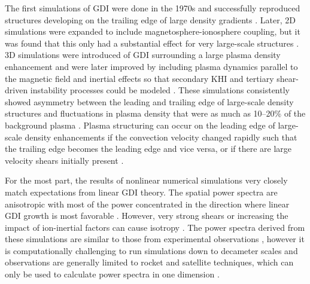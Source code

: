 The first simulations of GDI were done in the 1970s and successfully reproduced structures developing on the trailing edge of large density gradients \citep{Zabusky1973,Doles1976,Scannapieco1976,Ossakow1975,Ossakow1977}.  Later, 2D simulations were expanded to include magnetosphere-ionosphere coupling, but it was found that this only had a substantial effect for very large-scale structures \citep{Keskinen1990}.  3D simulations were introduced of GDI surrounding a large plasma density enhancement \citep{Guzdar1998} and were later improved by including plasma dynamics parallel to the magnetic field and inertial effects so that secondary KHI and tertiary shear-driven instability processes could be modeled \citep{Gondarenko1999}.  These simulations consistently showed asymmetry between the leading and trailing edge of large-scale density structures and fluctuations in plasma density that were as much as 10--20\% of the background plasma \citep{Gondarenko2004a,Gondarenko2004b}.  Plasma structuring can occur on the leading edge of large-scale density enhancements if the convection velocity changed rapidly such that the trailing edge becomes the leading edge and vice versa, or if there are large velocity shears initially present \citep{Gondarenko2004a,Gondarenko2004b}.

For the most part, the results of nonlinear numerical simulations very closely match expectations from linear GDI theory.  The spatial power spectra are anisotropic with most of the power concentrated in the direction where linear GDI growth is most favorable \citep{Keskinen1981,Keskinen1982,Gondarenko2001,Gondarenko2004b}.  However, very strong shears or increasing the impact of ion-inertial factors can cause isotropy \citep{Gondarenko2001,Gondarenko2006}.  The power spectra derived from these simulations are similar to those from experimental observations \citep{Baker1978,Kelley1979}, however it is computationally challenging to run simulations down to decameter scales and observations are generally limited to rocket and satellite techniques, which can only be used to calculate power spectra in one dimension \citep{Villain1986,Moen2012}.


